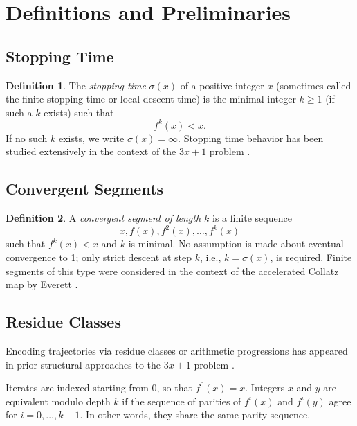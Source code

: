 \documentclass[12pt, oneside]{article}   	%
\numberwithin{equation}{section}          %
\theoremstyle{definition}
\newtheorem{define}{Definition}[section]
\begin{document}
\newpage
\section{Definitions and Preliminaries}
\label{sec:definitions}

\subsection{Stopping Time}

\begin{define}
The \emph{stopping time} \( \sigma(x) \) of a positive integer \(x\) (sometimes called the finite
stopping time or local descent time) is the minimal integer
\(k \ge 1\) (if such a \(k\) exists) such that
\[
f^k(x) < x.
\]
If no such \(k\) exists, we write \(\sigma(x) = \infty\). Stopping time behavior has been studied
extensively in the context of the $3x+1$ problem \cite{Terras1976}.
\end{define}


\subsection{Convergent Segments}

\begin{define}
A \emph{convergent segment of length \(k\)} is a finite sequence
\[
x, f(x), f^2(x), \ldots, f^k(x)
\]
such that \( f^k(x) < x \) and \(k\) is minimal. No assumption is made about eventual
convergence to 1; only strict descent at step \(k\), i.e., \(k = \sigma(x)\), is required.
Finite segments of this type were considered in the context of the accelerated Collatz map
by Everett \cite{Everett1977}.
\end{define}


\subsection{Residue Classes}

Encoding trajectories via residue classes or arithmetic progressions has appeared in prior
structural approaches to the $3x+1$ problem \cite{Wirsching1998,Chamberland2003}.

\medskip
Iterates are indexed starting from \(0\), so that \(f^0(x)=x\). 
Integers \(x\) and \(y\) are equivalent modulo depth \(k\) if the sequence of parities 
of \(f^i(x)\) and \(f^i(y)\) agree for \(i=0,\dots,k-1\). 
In other words, they share the same parity sequence. 
\end{document}
